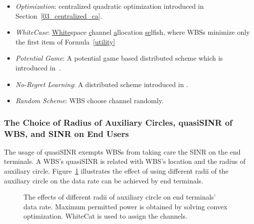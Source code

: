 \documentclass[times]{ettauth}
\theoremstyle{mytheoremstyle}
\theoremstyle{mytheoremstyle}
\theoremstyle{mytheoremstyle}
\begin{document}
\begin{itemize}
\item \textit{Optimization}: centralized quadratic optimization introduced in Section~\ref{03_centralized_ca}.

\item \textit{WhiteCase}:  \underline{White}space \underline{c}hannel \underline{a}llocation \underline{se}lfish, where WBSs minimize only the first item of Formula~\ref{utility}

\item \textit{Potential Game}: A potential game based distributed scheme which is introduced in~\cite{pimrc_2012}.

\item \textit{No-Regret Learning}: A distributed scheme introduced in \cite{hart00correlatedeq}.

\item \textit{Random Scheme}: WBS choose channel randomly.


\end{itemize}


\subsubsection{The Choice of Radius of Auxiliary Circles, quasiSINR of WBS, and SINR on End Users}
The usage of quasiSINR exempts WBSs from taking care the SINR on the end terminals.
A WBS's quasiSINR is related with WBS's location and the radius of auxiliary circle.
Figure~\ref{radius} illustrates the effect of using different radii of the auxiliary circle on the data rate can be achieved by end terminals.

\begin{figure}[h]
\centering
{}
\caption[]{The effects of different radii of auxiliary circle on end terminals' data rate. Maximum permitted power is obtained by solving convex optimization. WhiteCat is used to assign the channels.}
\label{radius}
\end{figure}
\end{document}
